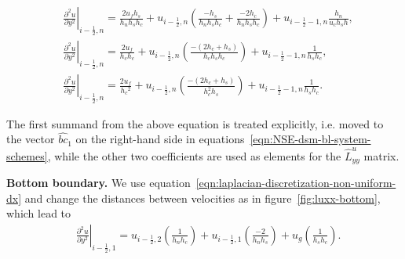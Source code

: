 \documentclass{article}
\begin{document}
\begin{equation}
\begin{aligned}
& \left.\frac{\partial ^2 u}{\partial y^2}\right|_{i-\frac{1}{2},n}=\frac{2 u_f h_s}{h_n h_s h_c}+u_{i-\frac{1}{2},n}\left(\frac{-h_s}{h_n h_s h_c}+\frac{-2 h_c}{h_n h_s h_c}\right)+u_{i-\frac{1}{2}-1,n} \frac{h_n}{u_c h_s h},\\
& \left.\frac{\partial^2 u}{\partial y^2}\right|_{i-\frac{1}{2},n}=\frac{2 u_f}{h_c h_c}+u_{i-\frac{1}{2},n}\left(\frac{-\left(2 h_c+h_s\right)}{h_c h_s h_c}\right)+u_{i-\frac{1}{2}-1,n} \frac{1}{h_s h_c}, \\
& \left.\frac{\partial^2 u}{\partial y^2}\right|_{i-\frac{1}{2},n}=\frac{2 u_f}{h_c{ }^2}+u_{i-\frac{1}{2},n}\left(\frac{-\left(2 h_c+h_s\right)}{h_c^2 h_s}\right)+u_{i-\frac{1}{2}-1,n} \frac{1}{h_s h_c}.
\end{aligned}
\end{equation}

The first summand from the above equation is treated explicitly, i.e. moved to the vector $\hat{bc}_1$ on the right-hand side in equations~\eqref{eqn:NSE-dsm-bl-system-schemes}, while the other two coefficients are used as elements for the $\hat{L}^u_{yy}$ matrix.

\textbf{Bottom boundary.}
We use equation~\eqref{eqn:laplacian-discretization-non-uniform-dx} and change the distances between velocities as in figure~\ref{fig:luxx-bottom}, which lead to
\begin{equation}
\begin{aligned}
&\left.\frac{\partial^ 2 u}{\partial y^2}\right|_{i-\frac{1}{2},1}=u_{i-\frac{1}{2},2}\left(\frac{1}{h_n h_c}\right)+u_{i-\frac{1}{2},1}\left(\frac{-2}{h_n h_s}\right)+u_g\left(\frac{1}{h_s h_c}\right).\\
\end{aligned}
\end{equation}
\end{document}
